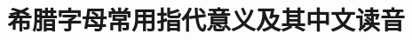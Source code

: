 \documentclass[cn,10.5pt,chinese,mac,chinesefont=founder]{elegantbook}
\begin{document}

\nocite{*} 
\appendix

\chapter{希腊字母常用指代意义及其中文读音}
\end{document}
